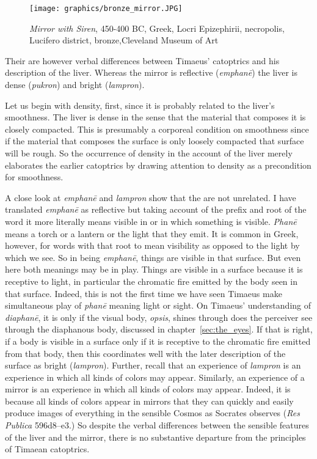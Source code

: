 \begin{figure}[htbp]
     \centering
         \texttt{[image: graphics/bronze\_mirror.JPG]}
     \caption{\emph{Mirror with Siren}, 450-400 BC, Greek, Locri Epizephirii, necropolis, Lucifero district, bronze,Cleveland Museum of Art}
     \label{bronze_mirror}
\end{figure}

Their are however verbal differences between Timaeus' catoptrics and his description of the liver. Whereas the mirror is reflective (\emph{emphanē}) the liver is dense (\emph{pukron}) and bright (\emph{lampron}). 

Let us begin with density, first, since it is probably related to the liver's smoothness. The liver is dense in the sense that the material that composes it is closely compacted. This is presumably a corporeal condition on smoothness since if the material that composes the surface is only loosely compacted that surface will be rough. So the occurrence of density in the account of the liver merely elaborates the earlier catoptrics by drawing attention to density as a precondition for smoothness. 

A close look at \emph{emphanē} and \emph{lampron} show that the are not unrelated. I have translated \emph{emphanē} as reflective but taking account of the prefix and root of the word it more literally means visible in or in which something is visible. \emph{Phanē} means a torch or a lantern or the light that they emit. It is common in Greek, however, for words with that root to mean visibility as opposed to the light by which we see. So in being \emph{emphanē}, things are visible in that surface. But even here both meanings may be in play. Things are visible in a surface because it is receptive to light, in particular the chromatic fire emitted by the body seen in that surface. Indeed, this is not the first time we have seen Timaeus make simultaneous play of \emph{phanē} meaning light or sight. On Timaeus' understanding of \emph{diaphanē}, it is only if the visual body, \emph{opsis}, shines through does the perceiver see through the diaphanous body, discussed in chapter~\ref{sec:the_eyes}. If that is right, if a body is visible in a surface only if it is receptive to the chromatic fire emitted from that body, then this coordinates well with the later description of the surface as bright (\emph{lampron}). Further, recall that an experience of \emph{lampron} is an experience in which all kinds of colors may appear. Similarly, an experience of a mirror is an experience in which all kinds of colors may appear. Indeed, it is because all kinds of colors appear in mirrors that they can quickly and easily produce images of everything in the sensible Cosmos as Socrates observes (\emph{Res Publica} 596d8--e3.) So despite the verbal differences between the sensible features of the liver and the mirror, there is no substantive departure from the principles of Timaean catoptrics.

